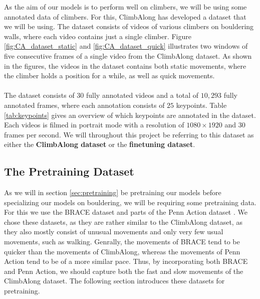 \documentclass[./main.tex]{subfiles}
\begin{document}
As the aim of our models is to perform well on climbers, we will be using some annotated data of climbers. For this, ClimbAlong has developed a dataset that we will be using. The dataset consists of videos of various climbers on bouldering walls, where each video contains just a single climber. Figure \ref{fig:CA_dataset_static} and \ref{fig:CA_dataset_quick} illustrates two windows of five consecutive frames of a single video from the ClimbAlong dataset. As shown in the figures, the videos in the dataset contains both static movements, where the climber holds a position for a while, as well as quick movements.
\\
\\
The dataset consists of $30$ fully annotated videos and a total of $10,293$ fully annotated frames, where each annotation consists of $25$ keypoints. Table \ref{tab:keypoints} gives an overview of which keypoints are annotated in the dataset. Each videos is filmed in portrait mode with a resolution of $1080 \times 1920$ and $30$ frames per second. We will throughout this project be referring to this dataset as either the \textbf{ClimbAlong dataset} or the \textbf{finetuning dataset}.

\subsection{The Pretraining Dataset}
\label{sec:dataset_pretraining}
As we will in section \ref{sec:pretraining} be pretraining our models before specializing our models on bouldering, we will be requiring some pretraining data. For this we use the BRACE dataset \cite{BRACE} and parts of the Penn Action dataset \cite{penn_action}. We chose these datasets, as they are rather similar to the ClimbAlong dataset, as they also mostly consist of unusual movements and only very few usual movements, such as walking. Genrally, the movements of BRACE tend to be quicker than the movements of ClimbAlong, whereas the movements of Penn Action tend to be of a more similar pace. Thus, by incorporating both BRACE and Penn Action, we should capture both the fast and slow movements of the ClimbAlong dataset. The following section introduces these datasets for pretraining.
\end{document}
